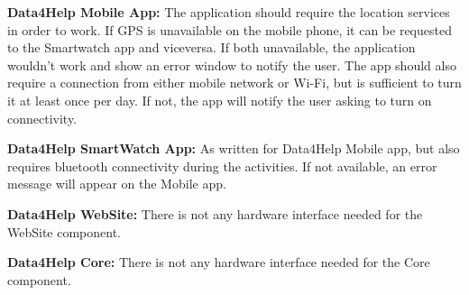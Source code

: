 \textbf{Data4Help Mobile App:} The application should require the location services in order to work. If GPS is unavailable on the mobile phone, it can be requested to the Smartwatch app and viceversa. If both unavailable, the application wouldn't work and show an error window to notify the user.
The app should also require a connection from either mobile network or Wi-Fi, but is sufficient to turn it at least once per day. If not, the app will notify the user asking to turn on connectivity. 

\textbf{Data4Help SmartWatch App:} As written for Data4Help Mobile app, but also requires bluetooth connectivity during the activities. If not available, an error message will appear on the Mobile app.

\textbf{Data4Help WebSite:} There is not any hardware interface needed for the WebSite component.

\textbf{Data4Help Core:} There is not any hardware interface needed for the Core component.